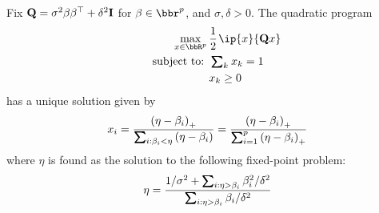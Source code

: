 \documentclass[12pt,leqno,letterpaper]{article}
\begin{document}
\vspace{-0.16in}
\begin{theorem}

Fix $\mathbf{Q} = \sigma^2 \beta \beta^\top + \delta^2 \mathbf{I}$
for $\beta \in \bbr^p$, and $\sigma,\delta > 0$.  The quadratic program
\begin{align}
\begin{aligned}
 \hspace{0.5in}\max_{x \in \bbR^p} \ptt
  &\frac{1}{2} \pt \ip{x}{\bQ x} \\
 \text{subject to: }
	 &\textstyle\sum\nolimits_k \hpt x_k =1  \\
	 & x_k \geq 0
\label{con}
\end{aligned}
\end{align}
has a unique solution given by
\begin{align}
x_i = \frac{\paren{\eta-\gb_i}_+}{\sum_{i: \gb_i < \eta} \paren{\eta-\gb_i}} = \frac{\paren{\eta-\gb_i}_+}{\sum_{i=1}^p \paren{\eta-\gb_i}_+}
\end{align}
where $\eta$ is found as the solution to the following fixed-point problem:
\begin{align}
\eta = \frac{1/\gs^2+ \sum_{i:\eta>\gb_i  } \gb_i^2/\gd^2}{\sum_{i:\eta>\gb_i} \gb_i/\gd^2}
\end{align}
\end{theorem}
\end{document}
